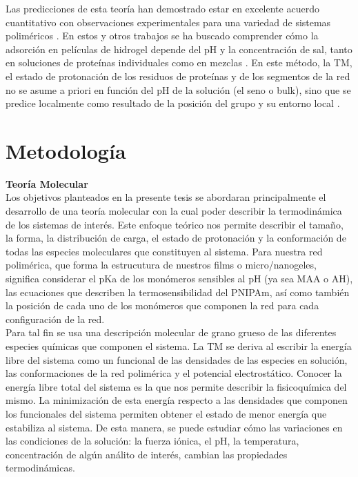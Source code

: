 Las predicciones de esta teor\'ia han demostrado estar en excelente acuerdo cuantitativo con observaciones experimentales para una variedad de sistemas polim\'ericos \cite{tagliazucchi2010responsive,wu2007behavior}. En estos y otros trabajos se ha buscado comprender c\'omo la adsorci\'on en  pel\'iculas de hidrogel depende del pH y la concentraci\'on de sal, tanto en soluciones de prote\'inas individuales como en mezclas \cite{hagemann2018use,tagliazucchi2010responsive,longo2016adsorption}. En este m\'etodo, la TM, el estado de protonaci\'on de los residuos de prote\'inas y de los segmentos de la red no se asume a priori en funci\'on del pH de la soluci\'on (el seno o bulk), sino que se predice localmente como resultado de la posici\'on del grupo y su entorno local \cite{longo2019protonation,tagliazucchi2010responsive}.\\


\section{Metodolog\'ia}

\textbf{Teor\'ia Molecular}\\
Los objetivos planteados en la presente tesis se abordaran principalmente el desarrollo de una teor\'ia molecular con la cual poder describir la termodin\'amica de los sistemas de inter\'es.
Este enfoque te\'orico nos permite describir el tama\~no, la forma, la distribuci\'on de carga, el estado de protonaci\'on y la conformaci\'on de todas las especies moleculares que constituyen al sistema. Para nuestra red polim\'erica, que forma la estrucutura de nuestros films o micro/nanogeles, significa considerar el pKa de los mon\'omeros sensibles al pH (ya sea MAA o AH), las ecuaciones que describen la termosensibilidad del PNIPAm, as\'i como tambi\'en la posici\'on de cada uno de los mon\'omeros que componen la red para cada configuraci\'on de la red.\\
Para tal fin se usa una descripci\'on molecular de grano grueso de las diferentes especies qu\'imicas que componen el sistema. 
La TM se deriva al escribir la energía libre del sistema como un funcional de las densidades de las especies en soluci\'on, las conformaciones de la red polim\'erica y el potencial electrost\'atico.
Conocer la energ\'ia libre total del sistema es la que nos permite describir la fisicoqu\'imica del mismo. La minimizaci\'on de esta energ\'ia respecto a las densidades que componen los funcionales del sistema permiten obtener el estado de menor energ\'ia que estabiliza al sistema.
De esta manera, se puede estudiar c\'omo las variaciones en las condiciones de la soluci\'on: la fuerza i\'onica, el pH, la temperatura, concentraci\'on de alg\'un an\'alito de inter\'es, cambian las propiedades termodin\'amicas.

